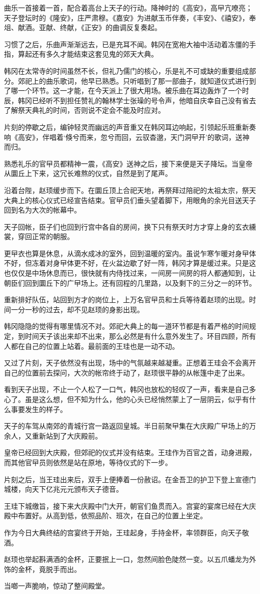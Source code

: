 曲乐一首接着一首，配合着高台上天子的行动。降神时的《高安》，高曱亢嘹亮；天子登坛时的《隆安》，庄严肃穆。《嘉安》为进献玉币伴奏，《丰安》、《禧安》，奉俎、献酒。亚献、终献，《正安》的曲调反复奏起。

习惯了之后，乐曲声渐渐远去，已是充耳不闻。韩冈在宽袍大袖中活动着冻僵的手指，算起还有多久才能结束这套见鬼的郊天大典。

韩冈在太常寺的时间虽然不长，但礼乃儒门的核心，乐是礼不可或缺的重要组成部分。郊祀上的曲乐歌词，他早已熟悉。只听唱到了那一部曲子，就知道仪式进行到了哪一个环节。这一才能，在今天派上了很大用场。被乐曲在耳边轰炸了一个时辰，韩冈已经听不到担任赞礼的翰林学士张璪的号令声，他暗自庆幸自己没有省去了解祭天典礼的时间，否则说不定会不能及时应对。

片刻的停歇之后，编钟轻灵而幽远的声音重又在韩冈耳边响起，引领起乐班重新奏响《高安》，伴唱着‘倏兮而来，忽兮而回，云驭杳邈，天门洞曱开’的歌词，送神而归。

熟悉礼乐的官曱员都精神一震，《高安》送神之后，接下来便是天子降坛。当皇帝从圜丘上下来，这冗长难熬的仪式，自然是到了尾声。

沿着台陛，赵顼缓步而下。在圜丘顶上合祀天地，再祭拜过陪祀的太祖太宗，祭天大典上的核心仪式已经宣告结束。官曱员们垂头望着脚下，用眼角的余光目送天子回到名为大次的帐幕中。

天子回帐，臣子们也回到行宫中各自的房间，换下只有祭天时方才穿上身的玄衣纁裳，穿回正常的朝服。

更曱衣也算是休息，从滴水成冰的室外，回到温暖的室内。虽说乍寒乍暖对身曱体不好，但冻着对身曱体更不好，在火盆边歇了好一阵，韩冈才算是缓过来。只是这也仅仅是中场休息而已，很快就有内侍找过来，一间房一间房的将人都通知到，让朝臣们回到圜丘下的广曱场上。还有回程的几里路，以及剩下的三分之一的环节。

重新排好队伍，站回到方才的岗位上，上万名官曱员和士兵等待着赵顼的出现。时间一分一秒的过去，却不见赵顼的身影出现。

韩冈隐隐的觉得有哪里情况不对。郊祀大典上的每一道环节都是有着严格的时间规定，到时间天子该出来却不出来，那么必然是有什么意外发生了。环目四顾，所有人都在自己的位置上站着。最前面的王珪也是一动不动。

又过了片刻，天子依然没有出现，场中的气氛越来越凝重。正想着王珪会不会离开自己的位置前去探问，大次的帐帘终于动了，赵顼很平静的从帐篷中走了出来。

看到天子出现，不止一个人松了一口气，韩冈也放松的轻叹了一声，看来是自己多心了。虽是这么想，但不知为什么，他的心头已经悄然蒙上了一层阴云，似乎有什么事要发生的样子。

天子的车驾从南郊的青城行宫一路返回皇城。半日前聚曱集在大庆殿广曱场上的万余人，又重新站到了大庆殿前。

皇帝已经回到大庆殿，但郊祀的仪式并没有结束。王珪作为百官之首，动身进殿，而其他官曱员则依然是站在原地，等待仪式的下一步。

片刻之后，当王珪出来后，双手上便捧着一份赦诏。在金吾卫的护卫下登上宣德门城楼，向天下亿兆元元颁布天子德音。

王珪下城缴旨，接下来大庆殿中门大开，朝官们鱼贯而入。宫宴的宴席已经在大庆殿中布置好。从高到低，依照品阶、班次，在自己的位置上坐定。

作为今日大典终结的宫宴终于开始，王珪起身，手持金杯，率领群臣，向天子敬酒。

赵顼也举起斟满酒的金杯，正要抿上一口，忽然间脸色陡然一变。以五爪蟠龙为外饰的金杯，竟脱手而出。

当啷一声脆响，惊动了整间殿堂。

